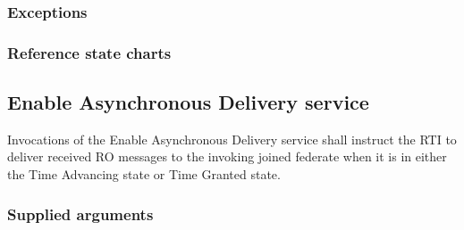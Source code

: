 \begin{compactstdpage}
    \subsubsection{Exceptions}


    \subsubsection{Reference state charts}


    \subsection{Enable Asynchronous Delivery service}

    Invocations of the Enable Asynchronous Delivery service shall instruct the RTI to deliver received RO messages to the invoking joined federate when it is in either the Time Advancing state or Time Granted state.

    \subsubsection{Supplied arguments}



\end{compactstdpage}

\clearpage

